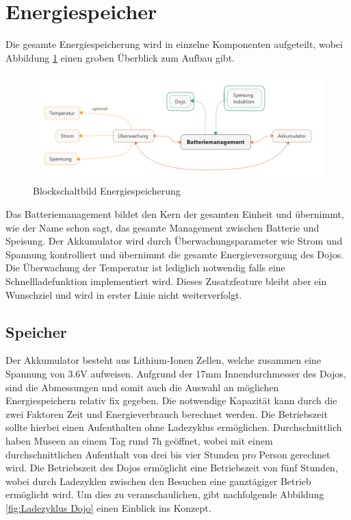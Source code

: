 \section{Energiespeicher}

Die gesamte Energiespeicherung wird in einzelne Komponenten aufgeteilt, wobei Abbildung \ref{fig:blockschaltbild} einen groben Überblick zum Aufbau gibt.

\begin{figure}[H]
	\begin{center}
		\includegraphics[width=160mm]{data/Batteriemanagement.png}
		\caption{Blockschaltbild Energiespeicherung} %
		\label{fig:blockschaltbild}
	\end{center}
\end{figure}

Das Batteriemanagement bildet den Kern der gesamten Einheit und übernimmt, wie der Name schon sagt, das gesamte Management zwischen Batterie und Speisung. Der Akkumulator wird durch Überwachungsparameter wie Strom und Spannung kontrolliert und übernimmt die gesamte Energieversorgung des Dojos. Die Überwachung der Temperatur ist lediglich notwendig falls eine Schnellladefunktion implementiert wird. Dieses Zusatzfeature bleibt aber ein Wunschziel und wird in erster Linie nicht weiterverfolgt.

\subsection{Speicher}
Der Akkumulator besteht aus Lithium-Ionen Zellen, welche zusammen eine Spannung von 3.6V aufweisen. Aufgrund der 17mm Innendurchmesser des Dojos, sind die Abmessungen und somit auch die Auswahl an möglichen Energiespeichern relativ fix gegeben. Die notwendige Kapazität kann durch die zwei Faktoren Zeit und Energieverbrauch berechnet werden. Die Betriebszeit sollte hierbei einen Aufenthalten ohne Ladezyklus ermöglichen. Durchschnittlich haben Museen an einem Tag rund 7h geöffnet, wobei mit einem durchschnittlichen Aufenthalt von drei bis vier Stunden pro Person gerechnet wird. Die Betriebszeit des Dojos ermöglicht eine Betriebszeit von fünf Stunden, wobei durch Ladezyklen zwischen den Besuchen eine ganztägiger Betrieb ermöglicht wird. Um dies zu veranschaulichen, gibt nachfolgende Abbildung \ref{fig:Ladezyklus Dojo} einen Einblick ins Konzept.

